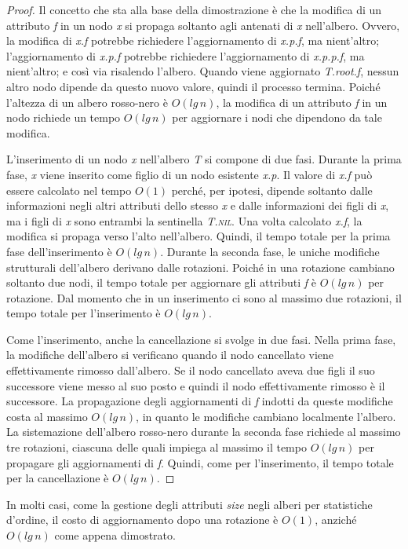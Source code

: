 \documentclass[10pt, a4paper]{report}
\begin{document}
\begin{proof}
Il concetto che sta alla base della dimostrazione è che la modifica di un attributo \textit{f} in un nodo \textit{x} si propaga soltanto agli antenati di \textit{x} nell'albero. Ovvero, la modifica di \textit{x.f} potrebbe richiedere l'aggiornamento di \textit{x.p.f}, ma nient'altro; l'aggiornamento di \textit{x.p.f} potrebbe richiedere l'aggiornamento di \textit{x.p.p.f}, ma nient'altro; e così via risalendo l'albero. Quando viene aggiornato \textit{T.root.f}, nessun altro nodo dipende da questo nuovo valore, quindi il processo termina. Poiché l'altezza di un albero rosso-nero è $O(lg\,n)$, la modifica di un attributo \textit{f} in un nodo richiede un tempo $O(lg\,n)$ per aggiornare i nodi che dipendono da tale modifica.

L'inserimento di un nodo \textit{x} nell'albero \textit{T} si compone di due fasi. Durante la prima fase, \textit{x} viene inserito come figlio di un nodo esistente \textit{x.p}. Il valore di \textit{x.f} può essere calcolato nel tempo $O(1)$ perché, per ipotesi, dipende soltanto dalle informazioni negli altri attributi dello stesso \textit{x} e dalle informazioni dei figli di \textit{x}, ma i figli di \textit{x} sono entrambi la sentinella \textit{T.\textsc{nil}}. Una volta calcolato \textit{x.f}, la modifica si propaga verso l'alto nell'albero. Quindi, il tempo totale per la prima fase dell'inserimento è $O(lg\,n)$. Durante la seconda fase, le uniche modifiche strutturali dell'albero derivano dalle rotazioni. Poiché in una rotazione cambiano soltanto due nodi, il tempo totale per aggiornare gli attributi \textit{f} è $O(lg\,n)$ per rotazione. Dal momento che in un inserimento ci sono al massimo due rotazioni, il tempo totale per l'inserimento è $O(lg\,n)$.

Come l'inserimento, anche la cancellazione si svolge in due fasi. Nella prima fase, la modifiche dell'albero si verificano quando il nodo cancellato viene effettivamente rimosso dall'albero. Se il nodo cancellato aveva due figli il suo successore viene messo al suo posto e quindi il nodo effettivamente rimosso è il successore. La propagazione degli aggiornamenti di \textit{f} indotti da queste modifiche costa al massimo $O(lg\,n)$, in quanto le modifiche cambiano localmente l'albero. La sistemazione dell'albero rosso-nero durante la seconda fase richiede al massimo tre rotazioni, ciascuna delle quali impiega al massimo il tempo $O(lg\,n)$ per propagare gli aggiornamenti di \textit{f}. Quindi, come per l'inserimento, il tempo totale per la cancellazione è $O(lg\,n)$.
\end{proof}
In molti casi, come la gestione degli attributi \textit{size} negli alberi per statistiche d'ordine, il costo di aggiornamento dopo una rotazione è $O(1)$, anziché $O(lg\,n)$ come appena dimostrato. 
\end{document}
